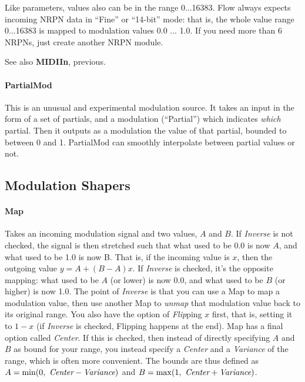 \documentclass{article}
\newcommand\name{Flow}
\begin{document}
Like parameters, values also can be in the range 0...16383.  {\name} always expects incoming NRPN data in ``Fine'' or ``14-bit'' mode: that is, the whole value range 0...16383 is mapped to modulation values 0.0 ... 1.0.  If you need more than 6 NRPNs, just create another NRPN module.  

See also {\bf MIDIIn}, previous.

\paragraph{PartialMod}  This is an unusual and experimental modulation source.  It takes an input in the form of a set of partials, and a modulation (``Partial'') which indicates {\it which} partial.  Then it outputs as a modulation the value of that partial, bounded to between 0 and 1.  PartialMod can smoothly interpolate between partial values or not.




\subsection{Modulation Shapers}

\paragraph{Map}  Takes an incoming modulation signal and two values, \(A\) and \(B\).  If {\it Inverse} is not checked, the signal is then stretched such that what used to be 0.0 is now \(A\), and what used to be 1.0 is now B.  That is, if the incoming value is \(x\), then the outgoing value \(y = A + (B - A)x\).  If {\it Inverse} is checked, it's the opposite mapping: what used to be \(A\) (or lower) is now 0.0, and what used to be \(B\) (or higher) is now 1.0.  The point of {\it Inverse} is that you can use a Map to map a modulation value, then use another Map to {\it unmap} that modulation value back to its original range.  You also have the option of {\it Flip}ping \(x\) first, that is, setting it to \(1-x\) (if {\it Inverse} is checked, Flipping happens at the end).  Map has a final option called {\it Center}.  If this is checked, then instead of directly specifying \(A\) and \(B\) as bound for your range, you instead specify a {\it Center} and a {\it Variance} of the range, which is often more convenient.  The bounds are thus defined as \(A = \min(0,\ \text{\it Center} - \text{\it Variance})\) and \(B = \max(1,\ \text{\it Center} + \text{\it Variance})\).
\end{document}
